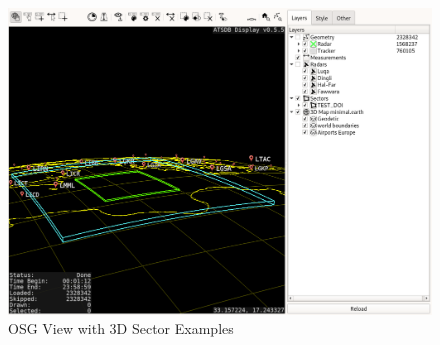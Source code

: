 \begin{figure}[H]
    \hspace*{-2.5cm}
    \includegraphics[width=19cm]{figures/osgview_sectors3d.png}
  \caption{OSG View with 3D Sector Examples}
\end{figure}
